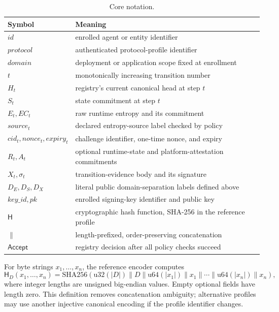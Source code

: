 \documentclass[11pt]{article}
\newcommand{\Hash}{\mathsf{H}}
\newcommand{\Accept}{\mathsf{Accept}}
\begin{document}
\begin{table}[ht]
\centering\small
\caption{Core notation.}
\begin{tabular}{p{}p{}}\toprule
Symbol & Meaning\\\midrule
$id$ & enrolled agent or entity identifier\\
$protocol$ & authenticated protocol-profile identifier\\
$domain$ & deployment or application scope fixed at enrollment\\
$t$ & monotonically increasing transition number\\
$H_t$ & registry's current canonical head at step $t$\\
$S_t$ & state commitment at step $t$\\
$E_t,EC_t$ & raw runtime entropy and its commitment\\
$source_t$ & declared entropy-source label checked by policy\\
$cid_t,nonce_t,expiry_t$ & challenge identifier, one-time nonce, and expiry\\
$R_t,A_t$ & optional runtime-state and platform-attestation commitments\\
$X_t,\sigma_t$ & transition-evidence body and its signature\\
$D_E,D_S,D_X$ & literal public domain-separation labels defined above\\
$key\_id,pk$ & enrolled signing-key identifier and public key\\
$\Hash$ & cryptographic hash function, SHA-256 in the reference profile\\
$\parallel$ & length-prefixed, order-preserving concatenation\\
$\Accept$ & registry decision after all policy checks succeed\\\bottomrule
\end{tabular}
\end{table}

For byte strings $x_1,\ldots,x_n$, the reference encoder computes
\begin{equation}
\Hash_D(x_1,\ldots,x_n)=\mathrm{SHA256}(\mathrm{u32}(|D|)\parallel D\parallel
\mathrm{u64}(|x_1|)\parallel x_1\parallel\cdots\parallel\mathrm{u64}(|x_n|)\parallel x_n),
\end{equation}
where integer lengths are unsigned big-endian values. Empty optional fields have length zero. This definition removes concatenation ambiguity; alternative profiles may use another injective canonical encoding if the profile identifier changes.
\end{document}
